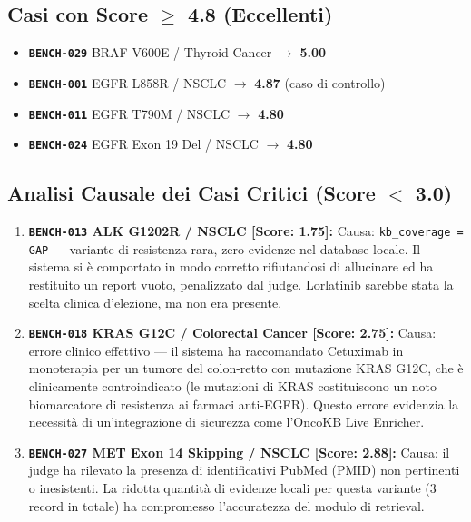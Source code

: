 \documentclass[12pt, a4paper]{article}
\newcommand{\bench}[1]{{\texttt{\textbf{#1}}}}
\begin{document}
\subsection{Casi con Score $\ge$ 4.8 (Eccellenti)}
\begin{itemize}[leftmargin=1.6em, itemsep=2pt]
  \item \bench{BENCH-029} BRAF V600E / Thyroid Cancer $\rightarrow$ \textbf{5.00}
  \item \bench{BENCH-001} EGFR L858R / NSCLC $\rightarrow$ \textbf{4.87} (caso di controllo)
  \item \bench{BENCH-011} EGFR T790M / NSCLC $\rightarrow$ \textbf{4.80}
  \item \bench{BENCH-024} EGFR Exon 19 Del / NSCLC $\rightarrow$ \textbf{4.80}
\end{itemize}

\subsection{Analisi Causale dei Casi Critici (Score $<$ 3.0)}
\begin{enumerate}[leftmargin=1.6em, itemsep=4pt]
  \item \textbf{\bench{BENCH-013} ALK G1202R / NSCLC [Score: 1.75]:}
        Causa: \texttt{kb\_coverage = GAP} --- variante di resistenza rara, zero evidenze nel database locale. Il sistema si è comportato in modo corretto rifiutandosi di allucinare ed ha restituito un report vuoto, penalizzato dal judge. Lorlatinib sarebbe stata la scelta clinica d'elezione, ma non era presente.
  \item \textbf{\bench{BENCH-018} KRAS G12C / Colorectal Cancer [Score: 2.75]:}
        Causa: errore clinico effettivo --- il sistema ha raccomandato Cetuximab in monoterapia per un tumore del colon-retto con mutazione KRAS G12C, che è clinicamente controindicato (le mutazioni di KRAS costituiscono un noto biomarcatore di resistenza ai farmaci anti-EGFR). Questo errore evidenzia la necessità di un'integrazione di sicurezza come l'OncoKB Live Enricher.
  \item \textbf{\bench{BENCH-027} MET Exon 14 Skipping / NSCLC [Score: 2.88]:}
        Causa: il judge ha rilevato la presenza di identificativi PubMed (PMID) non pertinenti o inesistenti. La ridotta quantità di evidenze locali per questa variante (3 record in totale) ha compromesso l'accuratezza del modulo di retrieval.
\end{enumerate}

\end{document}
